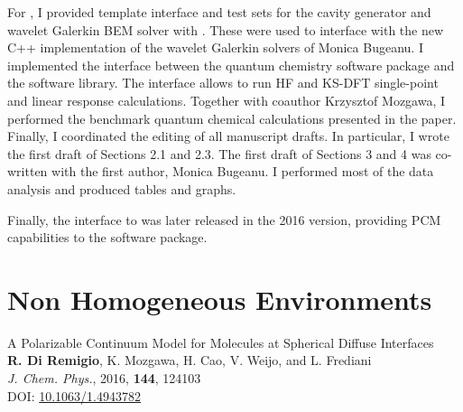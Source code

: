 For , I provided template interface and test sets for the cavity
generator\autocite{Harbrecht2009-no, Harbrecht2011-dk} and wavelet Galerkin
\acrshort{BEM} solver\autocite{Harbrecht2004-uo, Harbrecht2006-ug} with \pcmsolver.
These were used to interface with the new C++ implementation of the wavelet
Galerkin solvers of Monica Bugeanu.
I implemented the interface between the \LSDALTON quantum chemistry software
package and the \pcmsolver software library. The interface allows to run \acrshort{HF} and
\acrshort{KS}-\acrshort{DFT} single-point and linear response calculations.
Together with coauthor Krzysztof Mozgawa, I performed the benchmark quantum
chemical calculations presented in the paper.
Finally, I coordinated the editing of all manuscript drafts.
In particular, I wrote the first draft of Sections 2.1 and 2.3.
The first draft of Sections 3 and 4 was co-written with the first author, Monica Bugeanu.
I performed most of the data analysis and produced tables and graphs.

Finally, the interface to \LSDALTON was later released in the 2016 version,
providing \acrshort{PCM} capabilities to the software package.

\section{Non Homogeneous Environments}\label{sec:spherical}

\begin{tcolorbox}
  {\small
  \textsf{A Polarizable Continuum Model for Molecules at Spherical
  Diffuse Interfaces
  }
  \\
  \textbf{R. Di Remigio}, K. Mozgawa, H. Cao, V. Weijo, and L.
  Frediani
  \\
  \textit{J. Chem. Phys.}, \textrm{2016}, \textbf{144}, 124103
  \\
  DOI: \url{10.1063/1.4943782}
  }
\end{tcolorbox}

